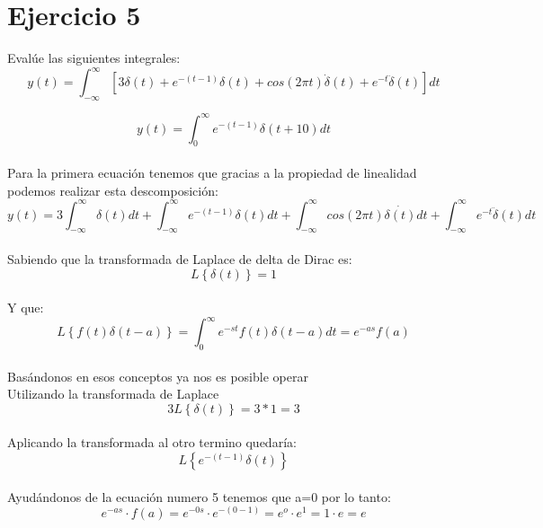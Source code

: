 \documentclass[10pt,a4paper]{report}
\begin{document}
\section{Ejercicio 5}

Evalúe las siguientes integrales:
\begin{equation}
y(t)=\int_{-\infty }^{\infty }[3\delta (t)+e^{-(t-1)}\delta (t)+cos(2\pi t)\dot{\delta} (t)+e^{-t}\ddot{\delta }(t) ]dt
\end{equation}

\begin{equation}
y(t)=\int_{0}^{\infty }e^{-(t-1)}\delta (t+10)dt
\end{equation}\\

Para la primera ecuación tenemos que gracias a la propiedad de      linealidad podemos realizar esta descomposición:\\

\begin{equation}
y(t)=3\int_{-\infty }^{\infty }\delta (t)dt+\int_{-\infty }^{\infty }e^{-(t-1)}\delta (t)dt+\int_{-\infty }^{\infty }cos(2\pi t)\dot{\delta (t)}dt+\int_{-\infty }^{\infty }e^{-t}\ddot{\delta}(t)dt
\end{equation}\\
Sabiendo que la transformada de Laplace de delta de Dirac es:
\begin{equation}
L\left \{ \delta \left ( t \right ) \right \}=1
\end{equation}\\
Y que:
\begin{equation}
L\left \{ f(t)\delta (t-a) \right \}=\int_{0 }^{\infty }e^{-st}f(t)\delta (t-a)dt=e^{-as}f(a)
\end{equation}\\
Basándonos en esos conceptos ya nos es posible operar\\
Utilizando la transformada de Laplace
\begin{equation}
3L\left \{ \delta (t) \right \}=3\ast 1=3
\end{equation}\\
Aplicando la transformada al otro termino quedaría:
\begin{equation}
L\left \{ e^{-(t-1)}\delta (t) \right \}
\end{equation}\\
Ayudándonos de la ecuación numero 5 tenemos que a=0 por lo tanto:\\
\begin{equation}
e^{-as}\cdot f(a)=e^{-0s}\cdot e^{-(0-1)}=e^{o}\cdot e^{1}=1\cdot e=e
\end{equation}\\
\end{document}
